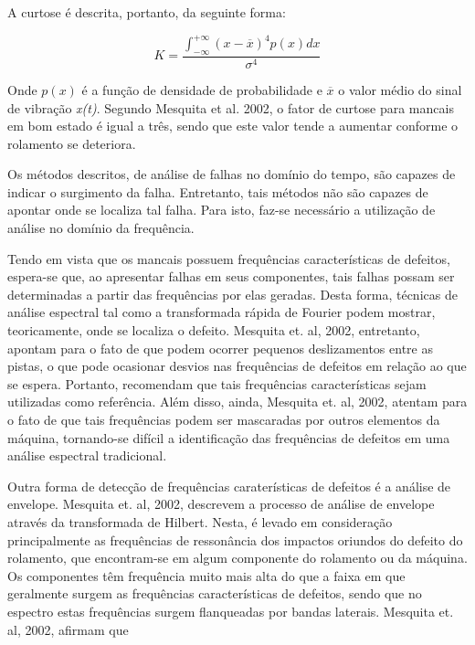 \documentclass[
	12pt,				
	oneside,			
	a4paper,			
	english,			
	brazil				
	]{abntex2ppgsi}
\begin{document}
A curtose é descrita, portanto, da seguinte forma:

\[K = \frac{ \int_{-\infty}^{+\infty} (x - \overline{x})^{4}p(x)dx } {\sigma^{4}} \]

Onde $p(x)$ é a função de densidade de probabilidade e $\overline{x}$ o valor médio do sinal de vibração \textit{x(t)}. Segundo Mesquita et al. 2002, o fator de curtose para mancais em bom estado é igual a três, sendo que este valor tende a aumentar conforme o rolamento se deteriora. 

Os métodos descritos, de análise de falhas no domínio do tempo, são capazes de indicar o surgimento da falha. Entretanto, tais métodos não são capazes de apontar onde se localiza tal falha. Para isto, faz-se necessário a utilização de análise no domínio da frequência. 

Tendo em vista que os mancais possuem frequências características de defeitos, espera-se que, ao apresentar falhas em seus componentes, tais falhas possam ser determinadas a partir das frequências por elas geradas. Desta forma, técnicas de análise espectral tal como a transformada rápida de Fourier podem mostrar, teoricamente, onde se localiza o defeito. Mesquita et. al, 2002, entretanto, apontam para o fato de que podem ocorrer pequenos deslizamentos entre as pistas, o que pode ocasionar desvios nas frequências de defeitos em relação ao que se espera. Portanto, recomendam que tais frequências características sejam utilizadas como referência. Além disso, ainda, Mesquita et. al, 2002, atentam para o fato de que tais frequências podem ser mascaradas por outros elementos da máquina, tornando-se difícil a identificação das frequências de defeitos em uma análise espectral tradicional.

Outra forma de detecção de frequências caraterísticas de defeitos é a análise de envelope. Mesquita et. al, 2002, descrevem a processo de análise de envelope através da transformada de Hilbert. Nesta, é levado em consideração principalmente as frequências de ressonância dos impactos oriundos do defeito do rolamento, que encontram-se em algum componente do rolamento ou da máquina. Os componentes têm frequência muito mais alta do que a faixa em que geralmente surgem as frequências características de defeitos, sendo que no espectro estas frequências surgem flanqueadas por bandas laterais. Mesquita et. al, 2002, afirmam que
\end{document}
